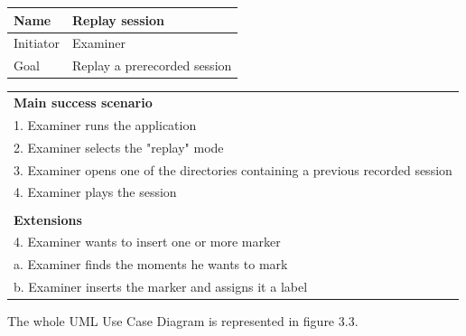 \documentclass[binding=0.6cm,LaM]{sapthesis}
\begin{document}
\begin{enumerate}
\begin{center}
\begin{tabular}{| l | l |}
  \hline			
  Name & Replay session \\
  \hline
  Initiator & Examiner \\
  \hline
  Goal & Replay a prerecorded session \\
  \hline  
\end{tabular}

\vspace{.5cm}

\begin{tabular}{ l }
\textbf{Main success scenario} \\
1. Examiner runs the application\\
2. Examiner selects the "replay" mode\\
3. Examiner opens one of the directories containing a previous recorded session \\
4. Examiner plays the session \\

\vspace{0.1cm}\\

\textbf{Extensions} \\
4. Examiner wants to insert one or more marker\\
\quad a. Examiner finds the moments he wants to mark \\
\quad b. Examiner inserts the marker and assigns it a label \\
\end{tabular}

\end{center}


\end{enumerate}

The whole UML Use Case Diagram is represented in figure 3.3. 
\end{document}
